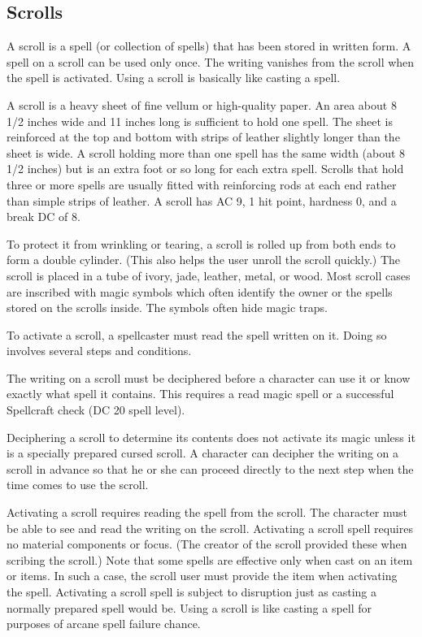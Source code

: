 \subsection{Scrolls}
A scroll is a spell (or collection of spells) that has been stored in written form. A spell on a scroll can be used only once. The writing vanishes from the scroll when the spell is activated. Using a scroll is basically like casting a spell.

 A scroll is a heavy sheet of fine vellum or high-quality paper. An area about 8 1/2 inches wide and 11 inches long is sufficient to hold one spell. The sheet is reinforced at the top and bottom with strips of leather slightly longer than the sheet is wide. A scroll holding more than one spell has the same width (about 8 1/2 inches) but is an extra foot or so long for each extra spell. Scrolls that hold three or more spells are usually fitted with reinforcing rods at each end rather than simple strips of leather. A scroll has AC 9, 1 hit point, hardness 0, and a break DC of 8.

To protect it from wrinkling or tearing, a scroll is rolled up from both ends to form a double cylinder. (This also helps the user unroll the scroll quickly.) The scroll is placed in a tube of ivory, jade, leather, metal, or wood. Most scroll cases are inscribed with magic symbols which often identify the owner or the spells stored on the scrolls inside. The symbols often hide magic traps.

 To activate a scroll, a spellcaster must read the spell written on it. Doing so involves several steps and conditions.

 The writing on a scroll must be deciphered before a character can use it or know exactly what spell it contains. This requires a read magic spell or a successful Spellcraft check (DC 20 \add spell level).

Deciphering a scroll to determine its contents does not activate its magic unless it is a specially prepared cursed scroll. A character can decipher the writing on a scroll in advance so that he or she can proceed directly to the next step when the time comes to use the scroll.

 Activating a scroll requires reading the spell from the scroll. The character must be able to see and read the writing on the scroll. Activating a scroll spell requires no material components or focus. (The creator of the scroll provided these when scribing the scroll.) Note that some spells are effective only when cast on an item or items. In such a case, the scroll user must provide the item when activating the spell. Activating a scroll spell is subject to disruption just as casting a normally prepared spell would be. Using a scroll is like casting a spell for purposes of arcane spell failure chance.

